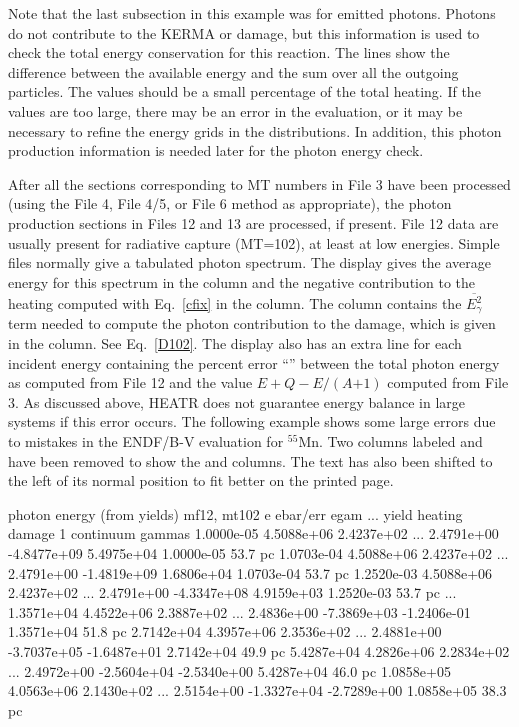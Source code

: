 \noindent
Note that the last subsection in this example was for emitted
photons.  Photons do not contribute to the KERMA or damage, but
this information is used to check the total energy conservation
for this reaction.  The  lines show the difference
between the available energy and the sum over all the outgoing
particles. The values should be a small percentage of the total
heating.  If the  values are too large, there may be
an error in the evaluation, or it may be necessary to refine the
energy grids in the distributions.  In addition, this photon
production information is needed later for the photon energy check.

After all the sections corresponding to MT numbers in File 3
have been processed (using the File 4, File 4/5, or File 6
method as appropriate), the photon production sections in
Files 12 and 13 are processed, if present.  File 12 data are
usually present for radiative capture (MT=102), at least at low
energies.  Simple files normally give a tabulated photon spectrum.
The display gives the average energy for this spectrum in the
 column and the negative contribution to the
heating computed with Eq.~\ref{cfix} in the 
column.  The  column contains the
$\overline{E^2_\gamma}$ term needed to compute the photon
contribution to the damage, which is given in the 
column.  See Eq.~\ref{D102}.  The display also has an extra
line for each incident energy containing the percent error
``'' between the total photon energy as computed
from File 12 and the value $E{+}Q{-}E/(A{+1})$ computed
from File 3.  As discussed above, HEATR does not guarantee energy
balance in large systems if this error occurs.  The following
example shows some large errors due to mistakes in the ENDF/B-V
evaluation for $^{55}$Mn.  Two columns labeled  and
 have been removed to show the  and
 columns.  The text has also been shifted to the
left of its normal position to fit better on the printed page.

\small
\begin{ccode}

 photon energy (from yields) mf12, mt102
          e    ebar/err        egam ...      yield     heating      damage
 1  continuum gammas
 1.0000e-05  4.5088e+06  2.4237e+02 ... 2.4791e+00 -4.8477e+09  5.4975e+04
 1.0000e-05    53.7 pc
 1.0703e-04  4.5088e+06  2.4237e+02 ... 2.4791e+00 -1.4819e+09  1.6806e+04
 1.0703e-04    53.7 pc
 1.2520e-03  4.5088e+06  2.4237e+02 ... 2.4791e+00 -4.3347e+08  4.9159e+03
 1.2520e-03    53.7 pc
   ...
 1.3571e+04  4.4522e+06  2.3887e+02 ... 2.4836e+00 -7.3869e+03 -1.2406e-01
 1.3571e+04    51.8 pc
 2.7142e+04  4.3957e+06  2.3536e+02 ... 2.4881e+00 -3.7037e+05 -1.6487e+01
 2.7142e+04    49.9 pc
 5.4287e+04  4.2826e+06  2.2834e+02 ... 2.4972e+00 -2.5604e+04 -2.5340e+00
 5.4287e+04    46.0 pc
 1.0858e+05  4.0563e+06  2.1430e+02 ... 2.5154e+00 -1.3327e+04 -2.7289e+00
 1.0858e+05    38.3 pc

\end{ccode}
\normalsize

